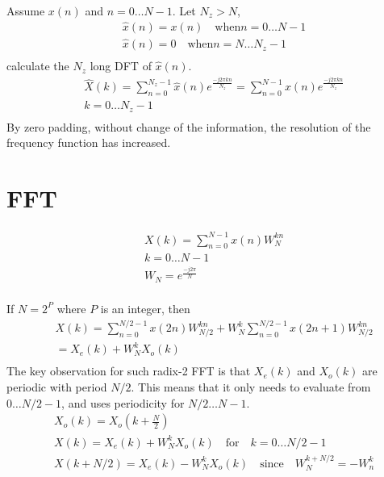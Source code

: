 Assume $x(n)$ and $n=0 \dots N-1$. Let $N_z > N$,
\begin{equation}
  \label{eq:zeropad}
  \begin{aligned}
    & \hat{x}(n) = x(n) \quad \text{when} n = 0 \dots N-1\\
    & \hat{x}(n) = 0 \quad \text{when} n=N \dots N_z-1 \\
  \end{aligned}
\end{equation}
calculate the $N_z$ long DFT of $\hat{x}(n)$.
\begin{equation}
  \label{eq:zeropadding}
\begin{aligned}
& \hat{X}(k)=\sum_{n=0}^{N_z-1}\hat{x}(n)e^{\frac{-j2\pi k n}{N_z}}=\sum_{n=0}^{N-1}x(n)e^{\frac{-j2\pi k n}{N_z}}  \\
& k = 0 \dots N_z-1 \\
\end{aligned}
\end{equation}
By zero padding, without change of the information, the resolution of the frequency function has increased. 

\section*{FFT}

\begin{equation}
  \label{eq:fftprinciple}
  \begin{aligned}
&    X(k) = \sum_{n=0}^{N-1}x(n)W_N^{kn} \\
& k = 0 \dots N-1 \\
& W_N = e^{\frac{-j2\pi}{N}}\\
  \end{aligned}
\end{equation}

If $N=2^P$ where $P$ is an integer, then
\begin{equation}
  \label{eq:evenodd}
  \begin{aligned}
&    X(k) = \sum_{n=0}^{N/2-1}x(2n)W_{N/2}^{kn} + W_N^k\sum_{n=0}^{N/2-1}x(2n+1)W_{N/2}^{kn} \\
& = X_e(k) + W_N^k X_o(k) \\
  \end{aligned}
\end{equation}
The key observation for such radix-2 FFT is that $X_e(k)$ and $X_o(k)$ are periodic with period $N/2$.
This means that it only needs to evaluate from $0 \dots N/2-1$, and uses periodicity for 
$N/2 \dots N-1$. 
\begin{equation}
  \label{eq:fftdetail}
  \begin{aligned}
&    X_o(k) = X_o(k+\frac{N}{2}) \\
& X(k) = X_e(k)+W_N^kX_o(k) \quad \text{for} \quad k=0 \dots N/2-1\\
& X(k+N/2) = X_e(k) -W_N^kX_o(k) \quad \text{since} \quad W_N^{k+N/2} = -W_n^k\\
  \end{aligned}
\end{equation}

